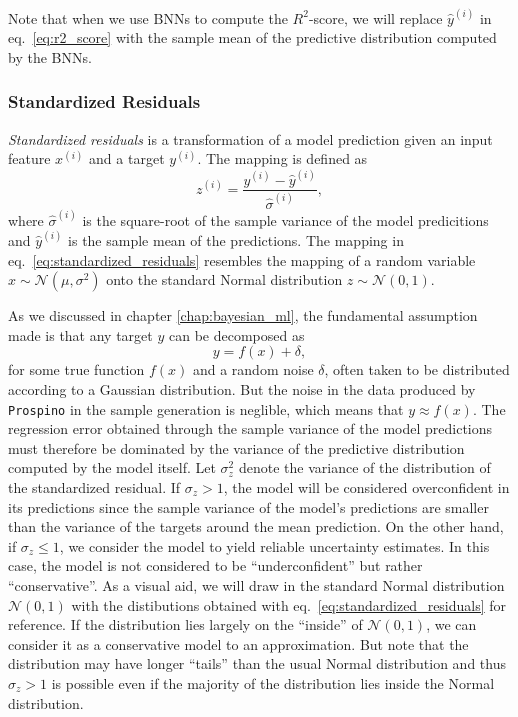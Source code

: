 Note that when we use BNNs to compute the $R^2$-score, we will replace $\hat{y}^{(i)}$ in eq.~\eqref{eq:r2_score} with the sample mean of the predictive distribution computed by the BNNs. 

\subsubsection{Standardized Residuals}
\textit{Standardized residuals} is a transformation of a model prediction given an input feature $x^{(i)}$ and a target $y^{(i)}$. The mapping is defined as
\begin{equation}\label{eq:standardized_residuals}
    z^{(i)} = \frac{y^{(i)} - \hat{y}^{(i)}}{\hat{\sigma}^{(i)}},
\end{equation}
where $\hat{\sigma}^{(i)}$ is the square-root of the sample variance of the model predicitions and $\hat{y}^{(i)}$ is the sample mean of the predictions. The mapping in eq.~\eqref{eq:standardized_residuals} resembles the mapping of a random variable $x \sim \mathcal{N}(\mu, \sigma^2)$ onto the standard Normal distribution $z \sim \mathcal{N}(0, 1)$.


As we discussed in chapter \ref{chap:bayesian_ml}, the fundamental assumption made is that any target $y$ can be decomposed as
\begin{equation}
    y = f(x) + \delta,
\end{equation}
for some true function $f(x)$ and a random noise $\delta$, often taken to be distributed according to a Gaussian distribution. But the noise in the data produced by \texttt{Prospino} in the sample generation is neglible, which means that $y \approx f(x)$. The regression error obtained through the sample variance of the model predictions must therefore be dominated by the variance of the predictive distribution computed by the model itself. Let $\sigma_z^2$ denote the variance of the distribution of the standardized residual. If $\sigma_z > 1$, the model will be considered overconfident in its predictions since the sample variance of the model's predictions are smaller than the variance of the targets around the mean prediction. On the other hand, if $\sigma_z \leq 1$, we consider the model to yield reliable uncertainty estimates. In this case, the model is not considered to be ``underconfident'' but rather ``conservative''. As a visual aid, we will draw in the standard Normal distribution $\mathcal{N}(0, 1)$ with the distibutions obtained with eq.~\eqref{eq:standardized_residuals} for reference. If the distribution lies largely on the ``inside'' of $\mathcal{N}(0, 1)$, we can consider it as a conservative model to an approximation. But note that the distribution may have longer ``tails'' than the usual Normal distribution and thus 
$\sigma_z > 1$ is possible even if the majority of the distribution lies inside the Normal distribution.

